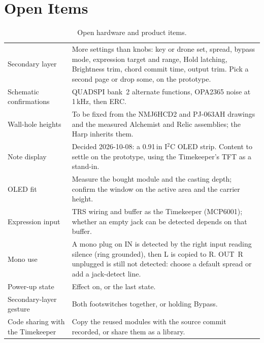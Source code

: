 \section{Open Items}
\begin{table}[H]
  \small\renewcommand{\arraystretch}{1.12}
  \caption{Open hardware and product items.}\label{tab:openhw}
  \begin{tabularx}{\textwidth}{@{}>{\raggedright\arraybackslash}p{38mm} L@{}}
    \toprule
     &  \\
    \midrule
    Secondary layer & More settings than knobs: key or drone set, spread, bypass mode, expression target and range, Hold latching, Brightness trim, chord commit time, output trim. Pick a second page or drop some, on the prototype. \\
    Schematic confirmations & QUADSPI bank~2 alternate functions, OPA2365 noise at 1\,kHz, then ERC. \\
    Wall-hole heights & To be fixed from the NMJ6HCD2 and PJ-063AH drawings and the measured Alchemist and Relic assemblies; the Harp inherits them. \\
    Note display & Decided 2026-10-08: a 0.91\,in I$^2$C OLED strip. Content to settle on the prototype, using the Timekeeper's TFT as a stand-in. \\
    OLED fit & Measure the bought module and the casting depth; confirm the window on the active area and the carrier height. \\
    Expression input & TRS wiring and buffer as the Timekeeper (MCP6001); whether an empty jack can be detected depends on that buffer. \\
    Mono use & A mono plug on IN is detected by the right input reading silence (ring grounded), then L is copied to R. OUT~R unplugged is still not detected: choose a default spread or add a jack-detect line. \\
    Power-up state & Effect on, or the last state. \\
    Secondary-layer gesture & Both footswitches together, or holding Bypass. \\
    Code sharing with the Timekeeper & Copy the reused modules with the source commit recorded, or share them as a library. \\
    \bottomrule
  \end{tabularx}
\end{table}

